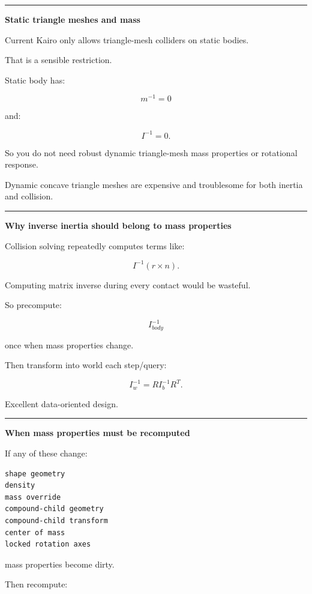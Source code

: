 \begin{center}\rule{0.5\linewidth}{0.5pt}\end{center}

\textbf{Static triangle meshes and mass}

Current Kairo only allows triangle-mesh colliders on static bodies.

That is a sensible restriction.

Static body has:

\[
m^{-1}=0
\]

and:

\[
I^{-1}=0.
\]

So you do not need robust dynamic triangle-mesh mass properties or rotational response.

Dynamic concave triangle meshes are expensive and troublesome for both inertia and collision.

\begin{center}\rule{0.5\linewidth}{0.5pt}\end{center}

\textbf{Why inverse inertia should belong to mass properties}

Collision solving repeatedly computes terms like:

\[
I^{-1}
(r\times n).
\]

Computing matrix inverse during every contact would be wasteful.

So precompute:

\[
I_{body}^{-1}
\]

once when mass properties change.

Then transform into world each step/query:

\[
I_w^{-1}
=
RI_b^{-1}R^T.
\]

Excellent data-oriented design.

\begin{center}\rule{0.5\linewidth}{0.5pt}\end{center}

\textbf{When mass properties must be recomputed}

If any of these change:

\begin{verbatim}
shape geometry
density
mass override
compound-child geometry
compound-child transform
center of mass
locked rotation axes
\end{verbatim}

mass properties become dirty.

Then recompute:

